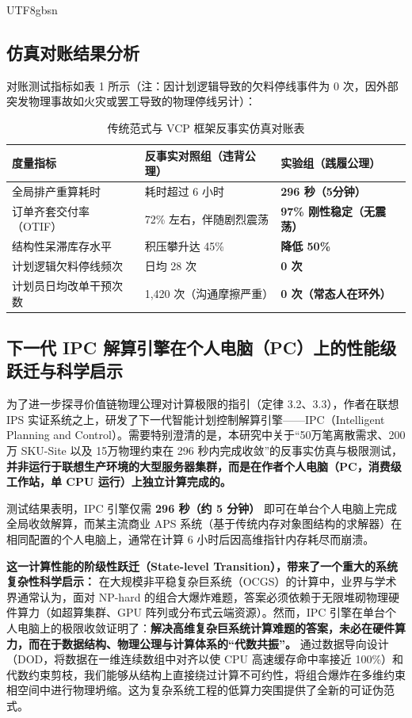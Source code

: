 \documentclass[11pt,a4paper]{article}
\begin{document}
\begin{CJK*}{UTF8}{gbsn}
\subsection{仿真对账结果分析}
对账测试指标如表 1 所示（注：因计划逻辑导致的欠料停线事件为 0 次，因外部突发物理事故如火灾或罢工导致的物理停线另计）：

\begin{table}[htbp]
\centering
\caption{传统范式与 VCP 框架反事实仿真对账表}
\label{tab:counterfactual}
\begin{tabular}{p{4cm}p{5cm}p{5cm}}
\toprule
\textbf{度量指标} & \textbf{反事实对照组（违背公理）} & \textbf{实验组（践履公理）} \\
\midrule
全局排产重算耗时 & 耗时超过 6 小时 & \textbf{296 秒（5分钟）} \\
\midrule
订单齐套交付率（OTIF） & 72\% 左右，伴随剧烈震荡 & \textbf{97\% 刚性稳定（无震荡）} \\
\midrule
结构性呆滞库存水平 & 积压攀升达 45\% & \textbf{降低 50\%} \\
\midrule
计划逻辑欠料停线频次 & 日均 28 次 & \textbf{0 次} \\
\midrule
计划员日均改单干预次数 & 1,420 次（沟通摩擦严重） & \textbf{0 次（常态人在环外）} \\
\bottomrule
\end{tabular}
\end{table}

\subsection{下一代 IPC 解算引擎在个人电脑（PC）上的性能级跃迁与科学启示}
为了进一步探寻价值链物理公理对计算极限的指引（定律 3.2、3.3），作者在联想 IPS 实证系统之上，研发了下一代智能计划控制解算引擎——IPC（Intelligent Planning and Control）。需要特别澄清的是，本研究中关于“50万笔离散需求、200万 SKU-Site 以及 15万物理约束在 296 秒内完成收敛”的反事实仿真与极限测试，\textbf{并非运行于联想生产环境的大型服务器集群，而是在作者个人电脑（PC，消费级工作站，单 CPU 运行）上独立计算完成的。}

测试结果表明，IPC 引擎仅需 \textbf{296 秒（约 5 分钟）} 即可在单台个人电脑上完成全局收敛解算，而某主流商业 APS 系统（基于传统内存对象图结构的求解器）在相同配置的个人电脑上，通常在计算 6 小时后因高维指针内存耗尽而崩溃。

\textbf{这一计算性能的阶级性跃迁（State-level Transition），带来了一个重大的系统复杂性科学启示：}
在大规模非平稳复杂巨系统（OCGS）的计算中，业界与学术界通常认为，面对 NP-hard 的组合大爆炸难题，答案必须依赖于无限堆砌物理硬件算力（如超算集群、GPU 阵列或分布式云端资源）。然而，IPC 引擎在单台个人电脑上的极限收敛证明了：\textbf{解决高维复杂巨系统计算难题的答案，未必在硬件算力，而在于数据结构、物理公理与计算体系的“代数共振”。} 通过数据导向设计（DOD，将数据在一维连续数组中对齐以使 CPU 高速缓存命中率接近 100\%）和代数约束剪枝，我们能够从结构上直接绕过计算不可约性，将组合爆炸在多维约束相空间中进行物理坍缩。这为复杂系统工程的低算力突围提供了全新的可证伪范式。


\end{CJK*}
\end{document}
